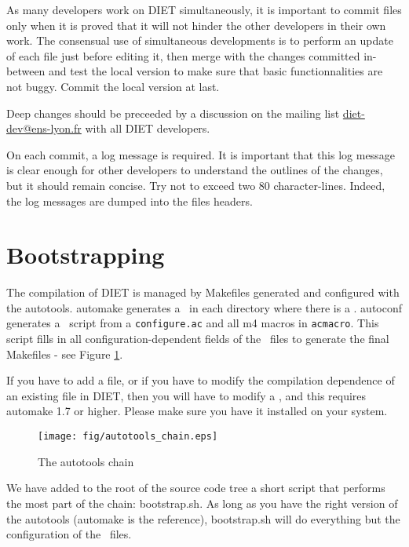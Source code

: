 As many developers work on DIET simultaneously, it is important to commit files
only when it is proved that it will not hinder the other developers in their own
work. The consensual use of simultaneous developments is to perform an update of
each file just before editing it, then merge with the changes committed
in-between and test the local version to make sure that basic functionnalities
are not buggy. Commit the local version at last.

Deep changes should be preceeded by a discussion on the mailing list
\url{diet-dev@ens-lyon.fr} with all DIET developers.

On each commit, a log message is required. It is important that this log message
is clear enough for other developers to understand the outlines of the changes,
but it should remain concise. Try not to exceed two 80 character-lines.  Indeed,
the log messages are dumped into the files headers.


\section{Bootstrapping}

The compilation of DIET is managed by Makefiles generated and configured with
the autotools. \textsf{automake} generates a \makein\ in each
directory where there is a \makeam. \textsf{autoconf} generates a
\configure\ script from a \texttt{configure.ac} and all m4 macros in
\texttt{acmacro}. This script fills in all configuration-dependent fields of the
\makein\ files to generate the final Makefiles - see Figure
\ref{fig:autochain}.

If you have to add a file, or if you have to modify the
compilation dependence of an existing file in DIET, then you will have to modify
a \makeam, and this requires \textsf{automake 1.7} or
higher. Please make sure you have it installed on your system.


\begin{figure}[hbt]
\begin{center}
\texttt{[image: fig/autotools\_chain.eps]}
\end{center}
\label{fig:autochain}
\caption{The autotools chain}
\end{figure}

We have added to the root of the source code tree a short script that performs
the most part of the chain: \textsf{bootstrap.sh}. As long as you have the right
version of the autotools (\textsf{automake} is the reference),
\textsf{bootstrap.sh} will do everything but the configuration of the
\makein\ files.\\

